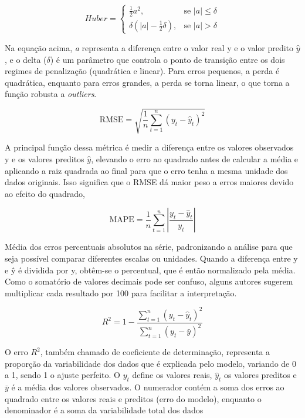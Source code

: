 \begin{equation}
Huber = 
\begin{cases} 
\frac{1}{2} a^2, & \text{se } |a| \leq \delta \\
\delta (|a| - \frac{1}{2} \delta), & \text{se } |a| > \delta 
\end{cases}
\end{equation}

Na equação acima, \textit{a} representa a diferença entre o valor real y e o valor predito  $\hat{y}$, e o delta ($  \delta $) é um parâmetro que controla o ponto de transição entre os dois regimes de penalização (quadrática e linear). Para erros pequenos, a perda é quadrática, enquanto para erros grandes, a perda se torna linear, o que torna a função robusta a \textit{outliers}.

\begin{equation}
    \text{RMSE} = \sqrt{\frac{1}{n} \sum_{t=1}^{n} (y_t - \hat{y}_t)^2}
\end{equation}

A principal função dessa métrica é medir a diferença entre os valores observados 
y e os valores preditos $\hat{y}$, elevando o erro ao quadrado antes de calcular a média e aplicando a raiz quadrada ao final para que o erro tenha a mesma unidade dos dados originais. Isso significa que o RMSE dá maior peso a erros maiores devido ao efeito do quadrado,

\begin{equation}
    \text{MAPE} = \frac{1}{n} \sum_{t=1}^{n} \left|\frac{y_t - \hat{y}_t}{y_t}\right|
\end{equation}

Média dos erros percentuais absolutos na série, padronizando a análise para que seja possível comparar diferentes escalas ou unidades.
Quando a diferença entre y e ŷ é dividida por y, obtêm-se o percentual, que é então normalizado pela média. Como o somatório de valores decimais pode ser confuso, alguns autores sugerem multiplicar cada resultado por 100 para facilitar a interpretação.

\begin{equation}
    R^2 = 1 - \frac{\sum_{t=1}^{n} (y_t - \hat{y}_t)^2}{\sum_{t=1}^{n}(y_t - \bar{y})^2}
\end{equation}

O erro $R^2$, também chamado de coeficiente de determinação, representa a proporção da variabilidade dos dados que é explicada pelo modelo, variando de 0 a 1, sendo 1 o ajuste perfeito.
O $y_t$ define os valores reais, $\hat{y}_t$ os valores preditos e $\bar{y}$ é a média dos valores observados. O numerador contém a soma dos erros ao quadrado entre os valores reais e preditos (erro do modelo), enquanto o denominador é a soma da variabilidade total dos dados

